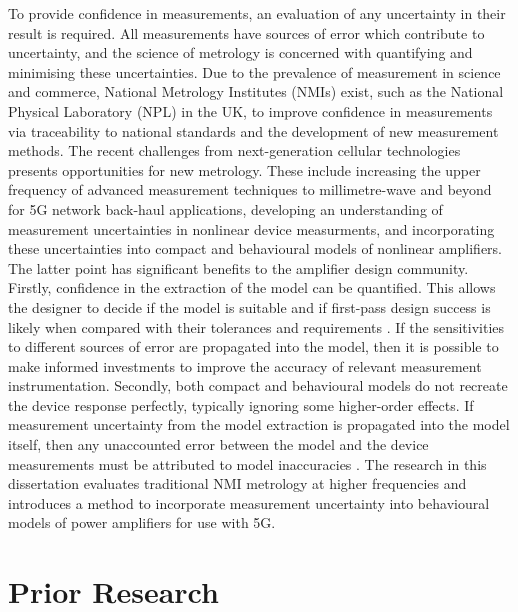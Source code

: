 \documentclass[../thesis/thesis.tex]{subfiles}
\begin{document}
To provide confidence in measurements, an evaluation of any uncertainty in their result is required. All measurements have sources of error which contribute to uncertainty, and the science of metrology is concerned with quantifying and minimising these uncertainties. Due to the prevalence of measurement in science and commerce, National Metrology Institutes (NMIs) exist, such as the National Physical Laboratory (NPL) in the UK, to improve confidence in measurements via traceability to national standards and the development of new measurement methods. The recent challenges from next-generation cellular technologies presents opportunities for new metrology. These include increasing the upper frequency of 
advanced measurement techniques to millimetre-wave and beyond for 5G network back-haul applications, developing an understanding of measurement uncertainties in nonlinear device measurments, and incorporating these uncertainties into compact and behavioural models of nonlinear amplifiers. The latter point has significant benefits to the amplifier design community. Firstly, confidence in the extraction of the model can be quantified. This allows the designer to decide if the model is suitable and if first-pass design success is likely when compared with their tolerances and requirements \cite{Williams_2016B}. If the sensitivities to different sources of error are propagated into the model, then it is possible to make informed investments to improve the accuracy of relevant measurement instrumentation. Secondly, both compact and behavioural models do not recreate the device response perfectly, typically ignoring some higher-order effects. If measurement uncertainty from the model extraction is propagated into the model itself, then any unaccounted error between the model and the device measurements must be attributed to model inaccuracies \cite{Cheron_2018}. The research in this dissertation evaluates traditional NMI metrology at higher frequencies and introduces a method to incorporate measurement uncertainty into behavioural models of power amplifiers for use with 5G.

\section{Prior Research}
\end{document}
